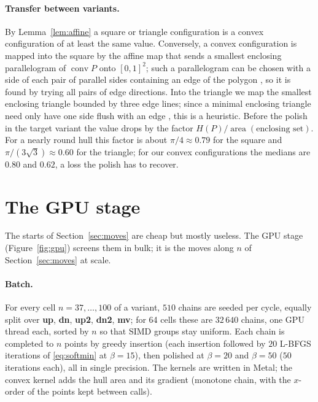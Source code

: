 \documentclass[11pt]{article}
\theoremstyle{remark}
\newcommand{\conv}{\operatorname{conv}}
\newcommand{\area}{\operatorname{area}}
\begin{document}
\paragraph{Transfer between variants.} By Lemma~\ref{lem:affine} a square or triangle configuration is a convex
configuration of at least the same value. Conversely, a convex configuration is mapped into the square by the affine
map that sends a smallest enclosing parallelogram of $\conv P$ onto $[0,1]^2$; such a parallelogram can be chosen with
a side of each pair of parallel sides containing an edge of the polygon \cite{STV95}, so it is found by trying all pairs
of edge directions. Into the triangle we map the smallest enclosing triangle bounded by three edge lines; since a
minimal enclosing triangle need only have one side flush with an edge \cite{ORourke86}, this is a heuristic. Before
the polish in the target variant the value drops by the factor $H(P)/\area(\text{enclosing set})$. For a nearly round
hull this factor is about $\pi/4 \approx 0.79$ for the square and $\pi/(3\sqrt3) \approx 0.60$ for the triangle; for
our convex configurations the medians are $0.80$ and $0.62$, a loss the polish has to recover.

\section{The GPU stage}\label{sec:gpu}

The starts of Section~\ref{sec:moves} are cheap but mostly useless. The GPU stage (Figure~\ref{fig:gpu}) screens them
in bulk; it is the moves along $n$ of Section~\ref{sec:moves} at scale.

\paragraph{Batch.} For every cell $n = 37, \dots, 100$ of a variant, $510$ chains are seeded per cycle, equally split
over \textbf{up}, \textbf{dn}, \textbf{up2}, \textbf{dn2}, \textbf{mv}; for 64 cells these are $32\,640$ chains, one GPU
thread each, sorted by $n$ so that SIMD groups stay uniform. Each chain is completed to $n$ points by greedy insertion
(each insertion followed by $20$ L-BFGS iterations of \eqref{eq:softmin} at $\beta = 15$), then polished at $\beta = 20$
and $\beta = 50$ ($50$ iterations each), all in single precision. The kernels are written in Metal; the convex kernel
adds the hull area and its gradient (monotone chain, with the $x$-order of the points kept between calls).
\end{document}
